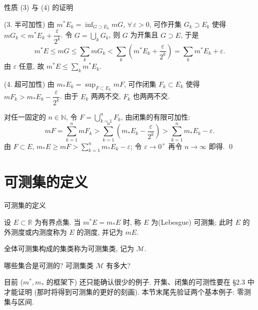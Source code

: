 
\begin{frame}{性质 (3) 与 (4) 的证明}

\startproof[bg=yellow, fg=red](3. 半可加性)
由 $m^* E_k = \inf_{G \supset E_k} m G$, $\forall\, \varepsilon > 0$, 可作开集 $G_k \supset E_k$ 使得 $m G_k < m^* E_k + \dfrac{\varepsilon}{2^k}$. 令 $G = \bigcup_k G_k$, 则 $G$ 为开集且 $G \supset E$, 于是
\[
m^* E \leqslant m G \leqslant \sum_k m G_k < \sum_k \left(m^* E_k + \frac{\varepsilon}{2^k}\right) = \sum_k m^* E_k + \varepsilon .
\]
由 $\varepsilon$ 任意, 故 $m^* E \leqslant \sum_k m^* E_k$.

\pause

\startproof[bg=yellow, fg=red](4. 超可加性)
由 $m_* E_k = \sup_{F \subset E_k} m F$, 可作闭集 $F_k \subset E_k$ 使得 $m F_k > m_* E_k - \dfrac{\varepsilon}{2^k}$. 由于 $E_k$ 两两不交, $F_k$ 也两两不交.

\pause

对任一固定的 $n \in \mathbb{N}$, 令 $F = \bigcup_{k=1}^n F_k$, 由闭集的有限可加性:
\[
m F = \sum_{k=1}^n m F_k > \sum_{k=1}^n \left(m_* E_k - \frac{\varepsilon}{2^k}\right) > \sum_{k=1}^n m_* E_k - \varepsilon .
\]
由 $F \subset E$, $m_* E \geqslant m F > \sum_{k=1}^n m_* E_k - \varepsilon$; 令 $\varepsilon \to 0^+$ 再令 $n \to \infty$ 即得.
\qed

\end{frame}


\section[可测集定义]{可测集的定义}


\begin{frame}{可测集的定义}

\begin{Def}
设 $E \subset \mathbb{R}$ 为有界点集. 当 $m^* E = m_* E$ 时, 称 $E$ 为\alert{(Lebesgue) 可测集}; 此时 $E$ 的外测度或内测度称为 $E$ 的\alert{测度}, 并记为 $m E$.
\end{Def}

\pause

全体可测集构成的集类称为\alert{可测集类}, 记为 $\mathscr{M}$.

\pause

\begin{question}
哪些集合是可测的? 可测集类 $\mathscr{M}$ 有多大?
\end{question}

\pause

\begin{remark}
目前 ($m^*, m_*$ 的框架下) 还只能确认很少的例子. 开集、闭集的可测性要在 §2.3 中才能证明 (那时将得到可测集的更好的刻画). 本节末尾先验证两个基本例子: \alert{零测集}与\alert{区间}.
\end{remark}

\end{frame}

